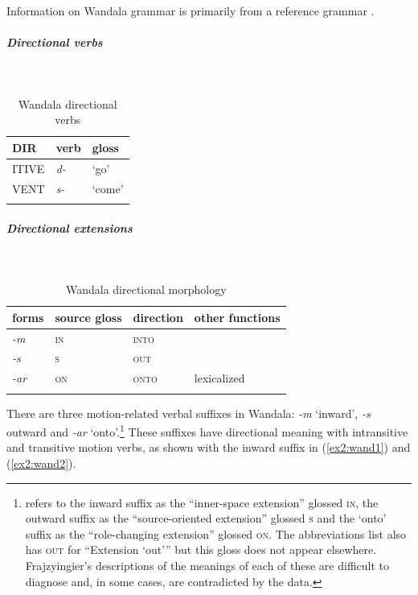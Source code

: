Information on Wandala grammar is primarily from a reference grammar \citep{frajzyngierGrammarWandala2012}.

\subparagraph{Directional verbs}~

\begin{table}[H]
	\caption{Wandala directional verbs} 
	\label{tab:wandV}
	\begin{tabular}{lll} %
		\lsptoprule
		DIR & verb & gloss   \\ %
		\midrule
		ITIVE & \textit{d-} & `go' \\
		VENT & \textit{s-} & `come' \\
		\lspbottomrule
	\end{tabular}
\end{table}

\subparagraph{Directional extensions}~

\begin{table}[H]
	\caption{Wandala directional morphology}
	\label{tab:wand}
	\begin{tabular}{llll} %
		\lsptoprule
		forms & source gloss & direction  & other functions  \\ %
		\midrule
		\textit{-m}  &  \textsc{in}  & \textsc{into}  &  \\
		\textit{-s}  &  \textsc{s}  &    \textsc{out} &   \\
		\textit{-ar}  &  \textsc{on}  &  \textsc{onto} &   lexicalized  \\
		\lspbottomrule
	\end{tabular}
\end{table} 

There are three motion-related verbal suffixes in Wandala: \textit{-m} `inward', \textit{-s} outward and \textit{-ar} `onto'.\footnote{\citet{frajzyngierGrammarWandala2012} refers to the inward suffix as the ``inner-space extension'' glossed \textsc{in}, the outward suffix as the ``source-oriented extension'' glossed \textsc{s} and the `onto' suffix as the ``role-changing extension'' glossed \textsc{on}. The abbreviations list also has \textsc{out} for ``Extension `out'{''} but this gloss does not appear elsewhere. Frajzyingier's descriptions of the meanings of each of these are difficult to diagnose and, in some cases, are contradicted by the data.} These suffixes have directional meaning with intransitive and transitive motion verbs, as shown with the inward suffix in (\ref{ex2:wand1}) and (\ref{ex2:wand2}).

